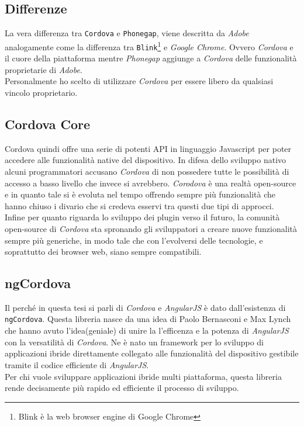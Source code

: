 \subsection{Differenze}
La vera differenza tra \texttt{Cordova} e \texttt{Phonegap}, viene descritta da \emph{Adobe} analogamente come la differenza tra \texttt{Blink}\footnote{Blink è la web browser engine di Google Chrome\cite{wiki:blink}} e \emph{Google Chrome}. Ovvero \emph{Cordova} e il cuore della piattaforma mentre \emph{Phonegap} aggiunge a \emph{Cordova} delle funzionalità proprietarie di \emph{Adobe}.\\
Personalmente ho scelto di utilizzare \emph{Cordova} per essere libero da qualsiasi vincolo proprietario.
\subsection{Cordova Core}
Cordova quindi offre una serie di potenti API in linguaggio Javascript per poter accedere alle funzionalità native del dispositivo. In difesa dello sviluppo nativo alcuni programmatori accusano \emph{Cordova} di non possedere tutte le possibilità di accesso a basso livello che invece si avrebbero. \emph{Corodova} è una realtà open-source e in quanto tale si è evoluta nel tempo offrendo sempre più funzionalità che hanno chiuso i divario che si credeva esservi tra questi due tipi di approcci.\\
Infine per quanto riguarda lo sviluppo dei plugin verso il futuro, la comunità open-source di \emph{Cordova} sta spronando gli sviluppatori a creare nuove funzionalità sempre più generiche, in modo tale che con l'evolversi delle tecnologie, e soprattutto dei browser web, siano sempre compatibili.
\subsection{ngCordova}
Il perché in questa tesi si parli di \emph{Cordova} e \emph{AngularJS} è dato dall'esistenza di \texttt{ngCordova}. Questa libreria nasce da una idea di Paolo Bernasconi e Max Lynch che hanno avuto l'idea(geniale) di unire la l'efficenza e la potenza di \emph{AngularJS} con la versatilità di \emph{Cordova}. Ne è nato un framework per lo sviluppo di applicazioni ibride direttamente collegato alle funzionalità del dispositivo gestibile tramite il codice efficiente di \emph{AngularJS}.\\
Per chi vuole sviluppare applicazioni ibride multi piattaforma, questa libreria rende decisamente più rapido ed efficiente il processo di sviluppo.
